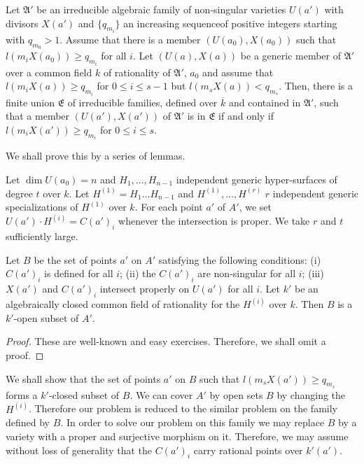 \begin{subprop}\label{art14-app-prop1.1}
Let $\mathfrak{A}'$ be an irreducible algebraic family of non-sin\-gular varieties $U(a')$ with divisors $X(a')$ and $\{q_{m_{i}}\}$ an increasing sequence\pageoriginale of positive integers starting with $q_{m_{0}}>1$. Assume that there is a member $(U(a_{0}), X(a_{0}))$ such that $l(m_{i}X(a_{0}))\geq q_{m_{i}}$ for all $i$. Let $(U(a), X(a))$ be a generic member of $\mathfrak{A}'$ over a common field $k$ of rationality of $\mathfrak{A}'$, $a_{0}$ and assume that $l(m_{i}X(a))\geq q_{m_{i}}$ for $0\leq i\leq s-1$ but $l(m_{s}X(a))<q_{m_{s}}$. Then, there is a finite union $\mathfrak{E}$ of irreducible families, defined over $\overline{k}$ and contained in $\mathfrak{A}'$, such that a member $(U(a'),X(a'))$ of $\mathfrak{A}'$ is in $\mathfrak{E}$ if and only if $l(m_{i}X(a'))\geq q_{m_{i}}$ for $0\leq i\leq s$.
\end{subprop}

We shall prove this by a series of lemmas.

Let $\dim U(a_{0})=n$ and $H_{1},\ldots,H_{n-1}$ independent generic hyper-surfaces of degree $t$ over $k$. Let $H^{(1)}=H_{1}\ldots H_{n-1}$ and $H^{(1)},\ldots,H^{(r)}$ $r$ independent generic specializations of $H^{(1)}$ over $k$. For each point $a'$ of $A'$, we set $U(a')\cdot H^{(i)}=C(a')_{i}$ whenever the intersection is proper. We take $r$ and $t$ sufficiently large.

\begin{sublemma}\label{art14-lem1.2}
Let $B$ be the set of points $a'$ on $A'$ satisfying the following conditions: {\rm(i)} $C(a')_{i}$ is defined for all $i$; {\rm(ii)} the $C(a')_{i}$ are non-singular for all $i$; {\rm(iii)} $X(a')$ and $C(a')_{i}$ intersect properly on $U(a')$ for all $i$. Let $k'$ be an algebraically closed common field of rationality for the $H^{(i)}$ over $k$. Then $B$ is a $k'$-open subset of $A'$.
\end{sublemma}

\begin{proof}
These are well-known and easy exercises. Therefore, we shall omit a proof.
\end{proof}

We shall show that the set of points $a'$ on $B$ such that $l(m_{s}X(a'))\geq q_{m_{s}}$ forms a $k'$-closed subset of $B$. We can cover $A'$ by open sets $B$ by changing the $H^{(i)}$. Therefore our problem is reduced to the similar problem on the family defined by $B$. In order to solve our problem on this family we may replace $B$ by a variety with a proper and surjective morphism on it. Therefore, we may assume without loss of generality that the $C(a')_{i}$ carry rational points over $k'(a')$.

